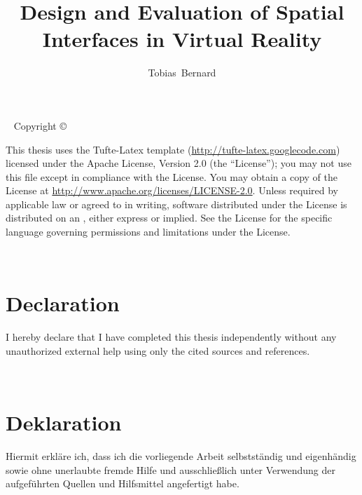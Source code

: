 \documentclass[nobib]{tufte-book} %
\title{Design and Evaluation of Spatial Interfaces in Virtual Reality} %
\author[Tobias Bernard]{Tobias\ Bernard} %
\begin{document}
\frontmatter


\maketitlepage %


\newpage
\begin{fullwidth}
~\vfill
\thispagestyle{empty}
\setlength{\parindent}{0pt}
\setlength{\parskip}{\baselineskip}
Copyright \copyright\ \the\year\ \thanklessauthor

\par This thesis uses the Tufte-Latex template (\url{http://tufte-latex.googlecode.com}) licensed under the Apache License, Version 2.0 (the ``License''); you may not use this file except in compliance with the License. You may obtain a copy of the License at \url{http://www.apache.org/licenses/LICENSE-2.0}. Unless required by applicable law or agreed to in writing, software distributed under the License is distributed on an , either express or implied. See the License for the specific language governing permissions and limitations under the License.

\end{fullwidth}


\newpage
\setlength{\parindent}{0pt}
\setlength{\parskip}{\baselineskip}

~\vspace{5pc}
\section{Declaration}
\par I hereby declare that I have completed this thesis independently without any unauthorized external help using only the cited sources and references.

~\vspace{3pc}
\section{Deklaration}
\par Hiermit erkl{\"a}re ich, dass ich die vorliegende Arbeit selbstst{\"a}ndig und eigenh{\"a}ndig sowie ohne unerlaubte fremde Hilfe und ausschlie{\ss}lich unter Verwendung der aufgef{\"u}hrten Quellen und Hilfsmittel angefertigt habe.
\end{document}
